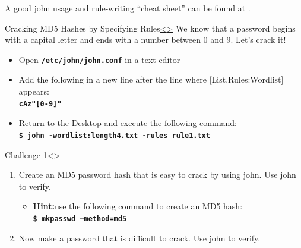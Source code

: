 \documentclass[12pt]{extarticle}
\newcommand{\code}[1]{\texttt{\bfseries#1}}
\newenvironment{instructionblock}{\Large\bgroup}{\egroup}
\newcommand{\bi}{\begin{itemize}}
\newcommand{\ei}{\end{itemize}}
\begin{document}
A good john usage and rule-writing ``cheat sheet'' can be found at \cite{cheat}.

\pagebreak
\begin{slide}{Cracking MD5 Hashes by Specifying Rules}{\hyperref[slide 12]{\textless}\hyperref[slide 14]{\textgreater}}
	\begin{instructionblock}
	We know that a password begins with a capital letter and ends with a number between 0 and 9. Let's crack it!
	\begin{itemize}
		\item Open \code{/etc/john/john.conf} in a text editor
		\item Add the following in a new line after the line where [List.Rules:Wordlist] appears: \\
		\code{cAz"[0-9]"}
		\item Return to the Desktop and execute the following command:\\
			\code{\$ john -wordlist:length4.txt -rules rule1.txt}
		
	\end{itemize}
	\end{instructionblock}
\end{slide}



\pagebreak
\begin{slide}{Challenge 1}{\hyperref[slide 13]{\textless}\hyperref[slide 15]{\textgreater}}
\vskip 5pt
\begin{instructionblock}
\begin{enumerate}
\item Create an MD5 password hash that is easy to crack by using john. Use john to verify.
	\bi
		\item\textbf{Hint:}\newline use the following command to create an MD5 hash:\\
			\code{\$ mkpasswd --method=md5}
	\ei 
	\item Now make a password that is difficult to crack. Use john to verify.
\end{enumerate}
\end{instructionblock}
\end{slide}
\end{document}
